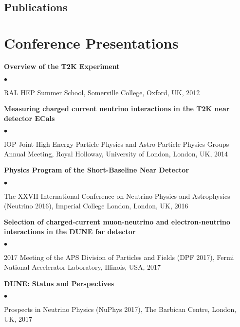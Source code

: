 \documentclass[margin,line]{res}
\newenvironment{list2}{
  \begin{list}{$\bullet$}{%
      \setlength{\itemsep}{0in}
      \setlength{\parsep}{0in} \setlength{\parskip}{0in}
      \setlength{\topsep}{0in} \setlength{\partopsep}{0in} 
      \setlength{\leftmargin}{0.2in}}}{\end{list}}
\begin{document}
\begin{resume}
 

 
\begin{refsection}[publications]
\nocite{*}
\section{\sc Publications}
\printbibliography
\end{refsection}

\section{\sc Conference Presentations}

{\bf Overview of the T2K Experiment}
\begin{list2}
\item RAL HEP Summer School, Somerville College, Oxford, UK, 2012
\end{list2}
{\bf Measuring charged current neutrino interactions in the T2K near detector ECals}
\begin{list2}
\item IOP Joint High Energy Particle Physics and Astro Particle Physics Groups Annual Meeting, Royal Holloway, University of London, London, UK, 2014
\end{list2}
{\bf Physics Program of the Short-Baseline Near Detector}
\begin{list2}
\item The XXVII International Conference on Neutrino Physics and Astrophysics (Neutrino 2016), Imperial College London, London, UK, 2016
\end{list2}
{\bf Selection of charged-current muon-neutrino and electron-neutrino interactions in the DUNE far detector}
\begin{list2}
\item 2017 Meeting of the APS Division of Particles and Fields (DPF 2017), Fermi National Accelerator Laboratory, Illinois, USA, 2017
\end{list2}
{\bf DUNE: Status and Perspectives}
\begin{list2}
\item Prospects in Neutrino Physics (NuPhys 2017), The Barbican Centre, London, UK, 2017
\end{list2}


\end{resume}
\end{document}
